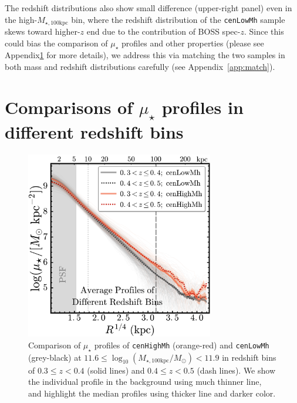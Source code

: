 \documentclass[a4paper,fleqn,usenatbib]{mnras}
\def\rbcg{\texttt{cenHighMh}}
\def\nbcg{\texttt{cenLowMh}}
\def\mtot{{$M_{\star,100\mathrm{kpc}}$}}
\def\logmtot{{$\log_{10} (M_{\star,100\mathrm{kpc}}/M_{\odot})$}}
\def\mden{{$\mu_{\star}$}}
\begin{document}
    The redshift distributions also show small difference
    (upper-right panel) even in the high-\mtot{} bin, where the redshift distribution 
    of the \nbcg{} sample skews toward higher-$z$ end due to the contribution of BOSS 
    spec-$z$.
    Since this could bias the comparison of \mden{} profiles and other properties 
    (please see Appendix\ref{app:redshift} for more details), we address this via matching 
    the two samples in both mass and redshift distributions carefully
    (see Appendix~\ref{app:match}).

\section{Comparisons of \mden{} profiles in different redshift bins}
    \label{app:redshift}
    
\begin{figure}
    \centering 
    \includegraphics[width=8.2cm]{fig/redbcg_avg_prof_z}
    \caption{
        Comparison of \mden{} profiles of \rbcg{} (orange-red) and \nbcg{} 
        (grey-black) at $11.6 \le$\logmtot$< 11.9$ in redshift bins of 
        $0.3\leq z<0.4$ (solid lines) and $0.4\leq z<0.5$ (dash lines). 
        We show the individual profile in the background using much thinner line, 
        and highlight the median profiles using thicker line and darker color.
        }
    \label{fig:avg_prof_z}
\end{figure}    
\end{document}
